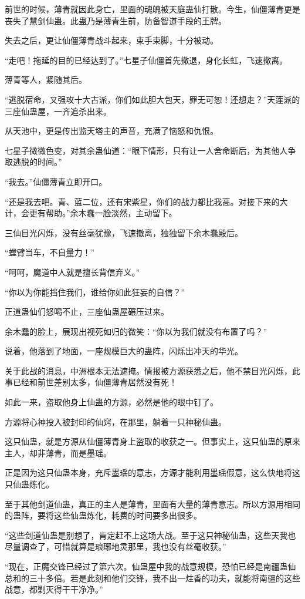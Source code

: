 \begin{this_body}
前世的时候，薄青就因此身亡，里面的魂魄被天庭蛊仙打散。今生，仙僵薄青更是丧失了慧剑仙蛊。此蛊乃是薄青生前，防备智道手段的王牌。

失去之后，更让仙僵薄青战斗起来，束手束脚，十分被动。

“走吧！拖延的目的已经达到了。”七星子仙僵首先撤退，身化长虹，飞速撤离。

薄青等人，紧随其后。

“逃脱宿命，又强攻十大古派，你们如此胆大包天，罪无可恕！还想走？”天莲派的三座仙蛊屋，一齐追杀出来。

从天池中，更是传出监天塔主的声音，充满了恼怒和仇恨。

七星子微微色变，对其余蛊仙道：“眼下情形，只有让一人舍命断后，为其他人争取逃脱的时间。”

“我去。”仙僵薄青立即开口。

“还是我去吧。青、蓝二位，还有宋紫星，你们的战力都比我高。对接下来的大计，会更有帮助。”余木蠢一脸淡然，主动留下。

三仙目光闪烁，没有丝毫犹豫，飞速撤离，独独留下余木蠢殿后。

“螳臂当车，不自量力！”

“呵呵，魔道中人就是擅长背信弃义。”

“你以为你能挡住我们，谁给你如此狂妄的自信？”

正道蛊仙们怒喝不止，三座仙蛊屋碾压过来。

余木蠢的脸上，展现出视死如归的微笑：“你以为我们就没有布置了吗？”

说着，他落到了地面，一座规模巨大的蛊阵，闪烁出冲天的华光。

关于此战的消息，中洲根本无法遮掩。情报被方源获悉之后，他不禁目光闪烁，此事已经和前世差别太多，仙僵薄青居然没有死！

如此一来，盗取他身上仙蛊的方源，必然是他的眼中钉了。

方源将心神投入被封印的仙窍，在那里，躺着一只神秘仙蛊。

这只仙蛊，就是方源从仙僵薄青身上盗取的收获之一。但事实上，这只仙蛊的原来主人，却非薄青，而是墨瑶。

正是因为这只仙蛊本身，充斥墨瑶的意志，方源才能利用墨瑶假意，这么快地将这只仙蛊炼化。

至于其他剑道仙蛊，真正的主人是薄青，里面有大量的薄青意志。所以方源用相同的蛊阵，要将这些仙蛊炼化，耗费的时间要多出很多。

“这些剑道仙蛊是别想了，肯定赶不上这场大战。至于这只神秘仙蛊，这些天我也尽量调查了，可惜就算是琅琊地灵那里，我也没有丝毫收获。”

“现在，正魔交锋已经过了第六次。仙蛊屋中我的战意规模，恐怕已经是南疆蛊仙总和的三十多倍。若是此刻和他们交锋，我不出一炷香的功夫，就能将南疆的这些战意，都剿灭得干干净净。”


\end{this_body}
